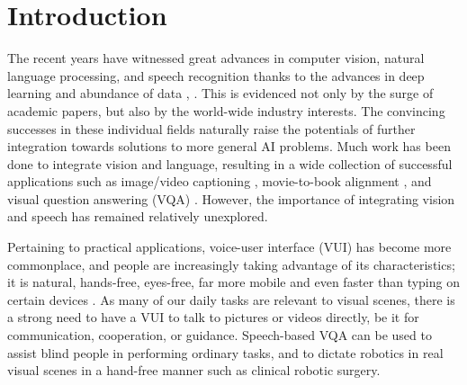 \documentclass[letterpaper]{article} %
\begin{document}
\section{Introduction}
The recent years have witnessed great advances in computer vision, natural language processing, and speech recognition thanks to the advances in deep learning \cite{lecun2015deep} and abundance of data \cite{imagenet:2015}, \cite{VQA}. This is evidenced not only by the surge of academic papers, but also by the world-wide industry interests. The convincing successes in these individual fields naturally raise the potentials of further integration towards solutions to more general AI problems. Much work has been done to integrate vision and language, resulting in a wide collection of successful applications such as image/video captioning \cite{show:tell:caption}, movie-to-book alignment \cite{align:bookmovie}, and visual question answering (VQA) \cite{VQA}. However, the importance of integrating vision and speech has remained relatively unexplored.

Pertaining to practical applications, voice-user interface (VUI) has become more commonplace, and people are increasingly taking advantage of its characteristics; it is natural, hands-free, eyes-free, far more mobile and even faster than typing on certain devices \cite{speech:faster}. As many of our daily tasks are relevant to visual scenes, there is a strong need to have a VUI to talk to pictures or videos directly, be it for communication, cooperation, or guidance. Speech-based VQA can be used to assist blind people in performing ordinary tasks, and to dictate robotics in real visual scenes in a hand-free manner such as clinical robotic surgery.
\end{document}
